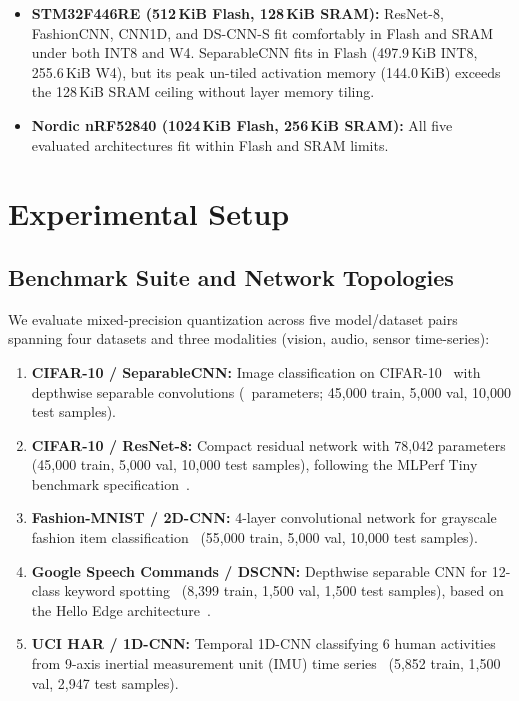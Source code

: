 \documentclass{ieeeaccess}
\begin{document}


\begin{itemize}
    \item \textbf{STM32F446RE (512\,KiB Flash, 128\,KiB SRAM):} ResNet-8, FashionCNN, CNN1D, and DS-CNN-S fit comfortably in Flash and SRAM under both INT8 and W4. SeparableCNN fits in Flash (497.9\,KiB INT8, 255.6\,KiB W4), but its peak un-tiled activation memory (144.0\,KiB) exceeds the 128\,KiB SRAM ceiling without layer memory tiling.
    \item \textbf{Nordic nRF52840 (1024\,KiB Flash, 256\,KiB SRAM):} All five evaluated architectures fit within Flash and SRAM limits.
\end{itemize}

\Needspace{\MacroSectionNeedspace\baselineskip}
\section{Experimental Setup}
\label{sec:setup}

\subsection{Benchmark Suite and Network Topologies}
We evaluate mixed-precision quantization across five model/dataset pairs spanning four datasets and three modalities (vision, audio, sensor time-series):
\begin{enumerate}
    \item \textbf{CIFAR-10 / SeparableCNN:} Image classification on CIFAR-10~\cite{krizhevsky2009cifar} with depthwise separable convolutions (\MacroBaselineParams\ parameters; 45,000 train, 5,000 val, 10,000 test samples).
    \item \textbf{CIFAR-10 / ResNet-8:} Compact residual network with 78,042 parameters (45,000 train, 5,000 val, 10,000 test samples), following the MLPerf Tiny benchmark specification~\cite{banbury2021mlperftiny}.
    \item \textbf{Fashion-MNIST / 2D-CNN:} 4-layer convolutional network for grayscale fashion item classification~\cite{xiao2017fmnist} (55,000 train, 5,000 val, 10,000 test samples).
    \item \textbf{Google Speech Commands / DSCNN:} Depthwise separable CNN for 12-class keyword spotting~\cite{warden2018speech} (8,399 train, 1,500 val, 1,500 test samples), based on the Hello Edge architecture~\cite{zhang2017hello}.
    \item \textbf{UCI HAR / 1D-CNN:} Temporal 1D-CNN classifying 6 human activities from 9-axis inertial measurement unit (IMU) time series~\cite{anguita2013har} (5,852 train, 1,500 val, 2,947 test samples).
\end{enumerate}
\end{document}

